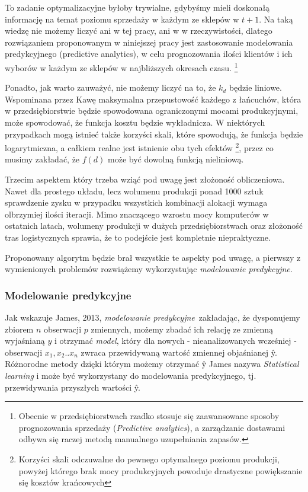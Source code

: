\documentclass{article}
\begin{document}
To zadanie optymalizacyjne byłoby trywialne, gdybyśmy mieli doskonałą informację na temat poziomu sprzedaży w każdym ze sklepów w $ t + 1 $. Na taką wiedzę nie możemy liczyć ani w tej pracy, ani w w rzeczywistości, dlatego rozwiązaniem proponowanym w niniejszej pracy jest zastosowanie modelowania predykcyjnego (predictive analytics), w celu prognozowania ilości klientów i ich wyborów w każdym ze sklepów w najbliższych okresach czasu. \footnote{Obecnie w przedsiębiorstwach rzadko stosuje się zaawansowane sposoby prognozowania sprzedaży (\textit{Predictive analytics}), a zarządzanie dostawami odbywa się raczej metodą manualnego uzupełniania zapasów.} 

Ponadto, jak warto zauważyć, nie możemy liczyć na to, że $k_d$ będzie liniowe. Wspominana przez Kawę maksymalna przepustowość każdego z łańcuchów, która w przedsiębiorstwie będzie spowodowana ograniczonymi mocami produkcyjnymi, może spowodować, że funkcja kosztu będzie wykładnicza. W niektórych przypadkach mogą istnieć także korzyści skali, które spowodują, że funkcja będzie logarytmiczna, a całkiem realne jest istnienie obu tych efektów  \footnote{Korzyści skali odczuwalne do pewnego optymalnego poziomu produkcji, powyżej którego brak mocy produkcyjnych powoduje drastyczne powiększanie się kosztów krańcowych}, przez co musimy zakładać, że $f(d)$ może być dowolną funkcją nieliniową.

Trzecim aspektem który trzeba wziąć pod uwagę jest złożoność obliczeniowa. Nawet dla prostego układu, lecz wolumenu produkcji ponad 1000 sztuk sprawdzenie zysku w przypadku wszystkich kombinacji alokacji wymaga olbrzymiej ilości iteracji. Mimo znaczącego wzrostu mocy komputerów w ostatnich latach, wolumeny produkcji w dużych przedsiębiorstwach oraz złożoność tras logistycznych sprawia, że to podejście jest kompletnie niepraktyczne. 

 Proponowany algorytm będzie brał wszystkie te aspekty pod uwagę, a pierwszy z wymienionych problemów rozwiążemy wykorzystując  \textit{modelowanie predykcyjne}.

\subsubsection{Modelowanie predykcyjne} 
Jak wskazuje James, 2013, \textit{modelowanie predykcyjne}\ zakładając, że dysponujemy zbiorem $n$ obserwacji $p$ zmiennych, możemy zbadać ich relację ze zmienną wyjaśnianą $y$ i otrzymać \textit{model}, który dla nowych - nieanalizowanych wcześniej - obserwacji $x_1,x_2..x_n$  zwraca przewidywaną wartość zmiennej objaśnianej \^{y}. Różnorodne metody dzięki którym możemy otrzymać \^{y} James nazywa \textit{Statistical learning} i może być wykorzystany do modelowania predykcyjnego, tj. przewidywania przyszłych wartości \^{y}. 
\end{document}
